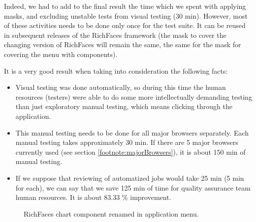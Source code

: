 \documentclass[11pt,oneside,final]{fithesis2}
\begin{document}
  Indeed, we had to add to the final result the time which we spent with applying masks, and excluding unstable tests from visual
  testing (30 min). However, most of these activities needs to be done only once for the test suite. It can be reused in subsequent
  releases of the RichFaces framework (the mask to cover the changing version of RichFaces will remain the same, the same for the mask for covering
  the menu with components).
  
  It is a very good result when taking into consideration the following facts:
  
  \begin{itemize}
   \item Visual testing was done automatically, so during this time the human resources (testers) were able to do some more 
   intellectually demanding testing than just exploratory manual testing, which means clicking through the application.
   \item This manual testing needs to be done for all major browsers separately. Each manual testing takes approximately 30 min.
         If there are 5 major browsers currently used (see section \ref{footnote:majorBrowsers}), it is about 150 min of manual testing.
   \item If we suppose that reviewing of automatized jobs would take 25 min (5 min for each), we can say that we save
	 125 min of time for quality assurance team human resources. It is about 83.33 \% improvement.
  \end{itemize}

  
  \begin{figure}[!htb]
      \begin{center}
      \leavevmode
      \centerline{}
      \end{center}
      \caption{RichFaces chart component renamed in application menu.}
      \label{fig:chartComponentRenamed}
  \end{figure}
  
\end{document}
